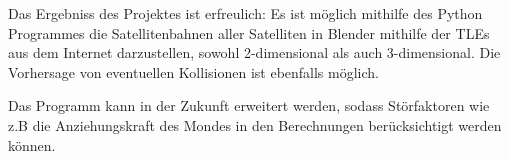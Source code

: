 Das Ergebniss des Projektes ist erfreulich: Es ist möglich mithilfe des Python Programmes die
Satellitenbahnen aller Satelliten in Blender mithilfe der TLEs aus dem Internet darzustellen,
sowohl 2-dimensional als auch 3-dimensional. Die Vorhersage von eventuellen Kollisionen ist
ebenfalls möglich.
\par
Das Programm kann in der Zukunft erweitert werden, sodass Störfaktoren wie z.B die
Anziehungskraft des Mondes in den Berechnungen berücksichtigt werden können.
